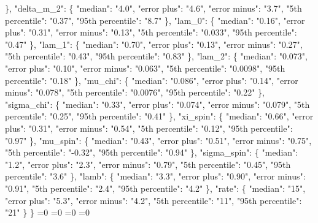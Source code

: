 {{      \}, %
      "delta\_m\_2": \{%
        "median": "4.0", %
        "error plus": "4.6", %
        "error minus": "3.7", %
        "5th percentile": "0.37", %
        "95th percentile": "8.7"%
      \}, %
      "lam\_0": \{%
        "median": "0.16", %
        "error plus": "0.31", %
        "error minus": "0.13", %
        "5th percentile": "0.033", %
        "95th percentile": "0.47"%
      \}, %
      "lam\_1": \{%
        "median": "0.70", %
        "error plus": "0.13", %
        "error minus": "0.27", %
        "5th percentile": "0.43", %
        "95th percentile": "0.83"%
      \}, %
      "lam\_2": \{%
        "median": "0.073", %
        "error plus": "0.10", %
        "error minus": "0.063", %
        "5th percentile": "0.0098", %
        "95th percentile": "0.18"%
      \}, %
      "mu\_chi": \{%
        "median": "0.086", %
        "error plus": "0.14", %
        "error minus": "0.078", %
        "5th percentile": "0.0076", %
        "95th percentile": "0.22"%
      \}, %
      "sigma\_chi": \{%
        "median": "0.33", %
        "error plus": "0.074", %
        "error minus": "0.079", %
        "5th percentile": "0.25", %
        "95th percentile": "0.41"%
      \}, %
      "xi\_spin": \{%
        "median": "0.66", %
        "error plus": "0.31", %
        "error minus": "0.54", %
        "5th percentile": "0.12", %
        "95th percentile": "0.97"%
      \}, %
      "mu\_spin": \{%
        "median": "0.43", %
        "error plus": "0.51", %
        "error minus": "0.75", %
        "5th percentile": "{-}0.32", %
        "95th percentile": "0.94"%
      \}, %
      "sigma\_spin": \{%
        "median": "1.2", %
        "error plus": "2.3", %
        "error minus": "0.79", %
        "5th percentile": "0.45", %
        "95th percentile": "3.6"%
      \}, %
      "lamb": \{%
        "median": "3.3", %
        "error plus": "0.90", %
        "error minus": "0.91", %
        "5th percentile": "2.4", %
        "95th percentile": "4.2"%
      \}, %
      "rate": \{%
        "median": "15", %
        "error plus": "5.3", %
        "error minus": "4.2", %
        "5th percentile": "11", %
        "95th percentile": "21"%
      \}%
    \}}%
  \else%
    \ifnum{}=0%
      \let\PowerLawTwoPeakThreeBBH@out\PowerLawTwoPeakThreeBBH@I%
    \else%
      \ifnum{}=0%
      \let\PowerLawTwoPeakThreeBBH@out\PowerLawTwoPeakThreeBBH@II%
    \else%
      \ifnum{}=0%
      \let\PowerLawTwoPeakThreeBBH@out\PowerLawTwoPeakThreeBBH@III%
    \else%
      \ifnum{}=0%
      \let\PowerLawTwoPeakThreeBBH@out\PowerLawTwoPeakThreeBBH@IV%
}
